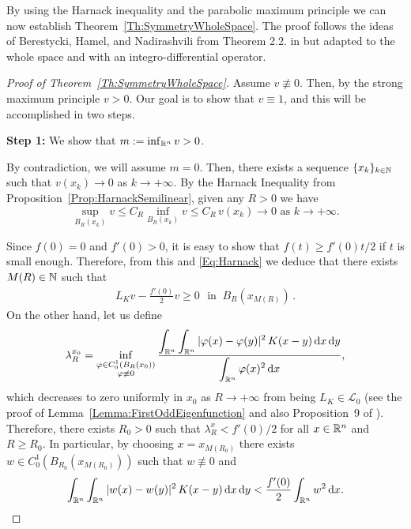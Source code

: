 

By using the Harnack inequality and the parabolic maximum principle we can now establish Theorem~\ref{Th:SymmetryWholeSpace}. The proof follows the ideas of Berestycki, Hamel, and Nadirashvili from Theorem 2.2. in \cite{BerestyckiHamelNadi} but adapted to the whole space and with an integro-differential operator.

\begin{proof}[Proof of Theorem~\ref{Th:SymmetryWholeSpace}]


Assume $v\not\equiv 0$. Then, by the strong maximum principle $v>0$. Our goal is to show that $v\equiv 1$, and this will be accomplished in two steps.

\textbf{Step 1:} We show that $m:=\inf_{\mathbb{R}^n} v >0$.

By contradiction, we will assume $m=0$. Then, there exists a sequence $\{x_k\}_{k\in\mathbb{N}}$ such that
$v(x_k)\rightarrow 0$ as $k \rightarrow +\infty$. By the Harnack Inequality from Proposition~\ref{Prop:HarnackSemilinear}, given any $R>0$ we have 
\begin{equation}
\label{Eq:Harnack}
\sup_{B_R(x_k)}v \leq C_R \inf_{B_R(x_k)}v \leq C_R \, v(x_k) \rightarrow 0 \,\,\text{as}\,\, k\rightarrow +\infty.
\end{equation}


Since $f(0) = 0 $ and $f'(0)>0$, it is easy to show that $f(t)\geq f'(0)t/2$ if $t$ is small enough. Therefore, from this and \eqref{Eq:Harnack}  we deduce that there exists $M(R)\in\mathbb{N}$ such that
\begin{align}
\label{Eq:WholeSpace2}
L_K  v - \frac{f'(0)}{2}v \geq 0 \,\,\textrm{ in }\ B_R(x_{M(R)})\,.
\end{align}
On the other hand, let us define
$$  \lambda_R^{x_0} = \inf_{\substack{\varphi\in C^1_0(B_R(x_0))\\ \varphi\not\equiv 0}} \frac{\displaystyle \int_{\mathbb{R}^n}\int_{\mathbb{R}^n}|\varphi(x)-\varphi(y)|^2\,K(x-y) \,\mathrm{d} x \,\mathrm{d} y}{\displaystyle \int_{\mathbb{R}^n}\varphi(x)^2 \,\mathrm{d} x}, 
$$
which decreases to zero uniformly in $x_0$ as $R\to +\infty$ from being $L_K \in\mathcal{L}_0$ (see the proof of Lemma~\ref{Lemma:FirstOddEigenfunction} and also Proposition~9 of \cite{ServadeiValdinoci}). Therefore, there exists $R_0>0$ such that $ \lambda_R^x < f'(0)/2$ for all $x\in \mathbb{R}^n$ and $R\geq R_0$. In particular, by choosing $x=x_{M(R_0)}$ there exists $w\in C^1_0(B_{R_0}(x_{M(R_0)}))$ such that $w\not\equiv 0$ and
\begin{equation}
\label{Eq:Eigenfunction}
\int_{\mathbb{R}^n}\int_{\mathbb{R}^n}|w(x)-w(y)|^2\,K(x-y) \,\mathrm{d} x \,\mathrm{d} y < \frac{f'(0)}{2}\int_{\mathbb{R}^n}w^2 \,\mathrm{d} x.
\end{equation}


\end{proof}
